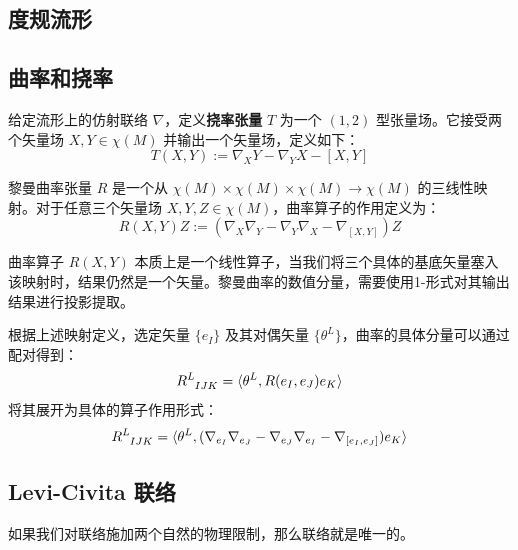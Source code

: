 \subsection{度规流形}
\subsection{曲率和挠率}

\begin{definition}[挠率张量]
    给定流形上的仿射联络 $\nabla$，定义\textbf{挠率张量} $T$ 为一个 $(1, 2)$ 型张量场。它接受两个矢量场 $X, Y \in \chi(M)$ 并输出一个矢量场，定义如下：
    \begin{equation}
        T(X, Y) := \nabla_X Y - \nabla_Y X - [X, Y]
    \end{equation}
\end{definition}

\begin{definition}[曲率张量]
    黎曼曲率张量 $R$ 是一个从 $\chi(M) \times \chi(M) \times \chi(M) \to \chi(M)$ 的三线性映射。对于任意三个矢量场 $X, Y, Z \in \chi(M)$，曲率算子的作用定义为：
    \begin{equation}
        R(X, Y)Z := (\nabla_X \nabla_Y  - \nabla_Y \nabla_X  - \nabla_{[X, Y]} )Z
    \end{equation}
\end{definition}

曲率算子 $R(X, Y)$ 本质上是一个线性算子，当我们将三个具体的基底矢量塞入该映射时，结果仍然是一个矢量。黎曼曲率的数值分量，需要使用1-形式对其输出结果进行投影提取。

根据上述映射定义，选定矢量 $\{e_I\}$ 及其对偶矢量 $\{\theta^L\}$，曲率的具体分量可以通过配对得到：
\begin{equation}
    \tensor{R}{^L_{I J K}} = \langle \theta^L, R(e_I, e_J) e_K \rangle
\end{equation}
将其展开为具体的算子作用形式：
\begin{equation}
    \tensor{R}{^L_{I J K}} = \langle \theta^L, (\nabla_{e_I} \nabla_{e_J} - \nabla_{e_J} \nabla_{e_I} - \nabla_{[e_I, e_J]}) e_K \rangle
\end{equation}
\subsection{Levi-Civita 联络}
如果我们对联络施加两个自然的物理限制，那么联络就是唯一的。


